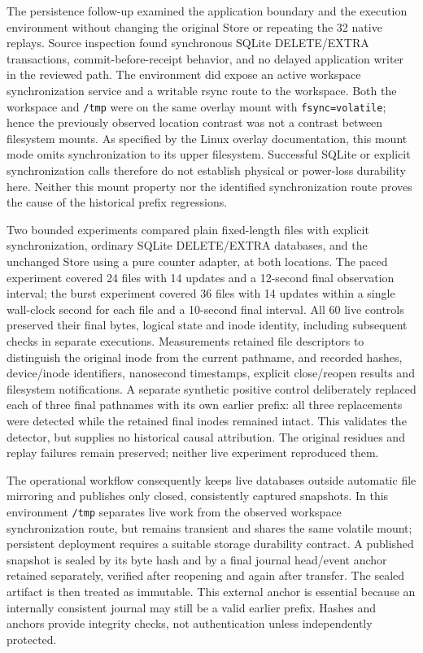 The persistence follow-up examined the application boundary and the execution
environment without changing the original Store or repeating the 32 native
replays.  Source inspection found synchronous SQLite DELETE/EXTRA transactions,
commit-before-receipt behavior, and no delayed application writer in the
reviewed path.  The environment did expose an active workspace synchronization
service and a writable rsync route to the workspace.  Both the workspace and
\texttt{/tmp} were on the same overlay mount with
\texttt{fsync=volatile}; hence the previously observed location contrast was
not a contrast between filesystem mounts.  As specified by the Linux overlay
documentation, this mount mode omits synchronization to its upper filesystem.
Successful SQLite or explicit synchronization calls therefore do not establish
physical or power-loss durability here.  Neither this mount property nor the
identified synchronization route proves the cause of the historical prefix
regressions.

Two bounded experiments compared plain fixed-length files with explicit
synchronization, ordinary SQLite DELETE/EXTRA databases, and the unchanged
Store using a pure counter adapter, at both locations.  The paced experiment
covered 24 files with 14 updates and a 12-second final observation interval;
the burst experiment covered 36 files with 14 updates within a single
wall-clock second for each file and a 10-second final interval.  All 60 live
controls preserved their final bytes, logical state and inode identity,
including subsequent checks in separate executions.  Measurements retained
file descriptors to distinguish the original inode from the current pathname,
and recorded hashes, device/inode identifiers, nanosecond timestamps, explicit
close/reopen results and filesystem notifications.  A separate synthetic
positive control deliberately replaced each of three final pathnames with its
own earlier prefix: all three replacements were detected while the retained
final inodes remained intact.  This validates the detector, but supplies no
historical causal attribution.  The original residues and replay failures
remain preserved; neither live experiment reproduced them.

The operational workflow consequently keeps live databases outside automatic
file mirroring and publishes only closed, consistently captured snapshots.
In this environment \texttt{/tmp} separates live work from the observed
workspace synchronization route, but remains transient and shares the same
volatile mount; persistent deployment requires a suitable storage durability
contract.  A published snapshot is sealed by its byte hash and by a final
journal head/event anchor retained separately, verified after reopening and
again after transfer.  The sealed artifact is then treated as immutable.
This external anchor is essential because an internally consistent journal
may still be a valid earlier prefix.  Hashes and anchors provide integrity
checks, not authentication unless independently protected.
